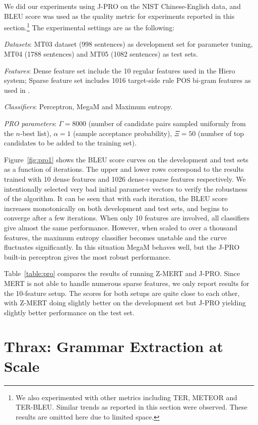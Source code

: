 \documentclass[11pt]{article}
\begin{document}
We did our experiments using J-PRO on the NIST Chinese-English data,
and BLEU score was used as the quality metric for experiments reported
in this section.\footnote{We also experimented with other metrics
  including TER, METEOR and TER-BLEU. Similar trends as reported in
  this section were observed. These results are omitted here due to
  limited space.} The experimental settings are as the following:

\emph{Datasets}: MT03 dataset (998 sentences) as development set for
parameter tuning, MT04 (1788 sentences) and MT05 (1082 sentences) as
test sets.

\emph{Features}: Dense feature set include the 10 regular features
used in the Hiero system; Sparse feature set includes 1016 target-side
rule POS bi-gram features as used in \cite{Li2010coling}.

\emph{Classifiers}: Perceptron, MegaM and Maximum entropy.

\emph{PRO parameters}: $\Gamma=8000$ (number of candidate pairs sampled
uniformly from the $n$-best list), $\alpha=1$ (sample acceptance
probability), $\Xi=50$ (number of top candidates to be added to the
training set).

Figure~\ref{fig:pro1} shows the BLEU score curves on the development
and test sets as a function of iterations. The upper and lower rows
correspond to the results trained with 10 dense features and 1026
dense+sparse features respectively. We intentionally selected very bad
initial parameter vectors to verify the robustness of the
algorithm. It can be seen that with each iteration, the BLEU score
increases monotonically on both development and test sets, and begins
to converge after a few iterations. When only 10 features are
involved, all classifiers give almost the same performance. However,
when scaled to over a thousand features, the maximum entropy
classifier becomes unstable and the curve fluctuates significantly. In
this situation MegaM behaves well, but the J-PRO built-in perceptron
gives the most robust performance.

Table~\ref{table:pro} compares the results of running Z-MERT and
J-PRO. Since MERT is not able to handle numerous sparse features, we
only report results for the 10-feature setup. The scores for both
setups are quite close to each other, with Z-MERT doing slightly
better on the development set but J-PRO yielding slightly better
performance on the test set.


\section{Thrax: Grammar Extraction at Scale}
\label{sec-thrax}
\end{document}
